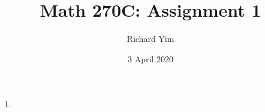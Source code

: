 \documentclass[10pt]{article}
\title{Math 270C: Assignment 1}
\author{Richard Yim}
\date{3 April 2020}
\begin{document}
\maketitle
\begin{enumerate}
\item
\end{enumerate}
\end{document}

